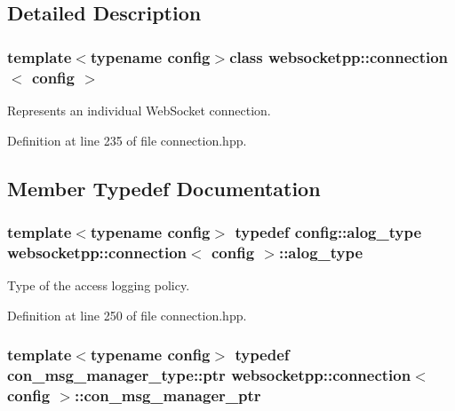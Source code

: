 \subsection{Detailed Description}
\subsubsection*{template$<$typename config$>$class websocketpp\+::connection$<$ config $>$}

Represents an individual Web\+Socket connection. 

Definition at line 235 of file connection.\+hpp.



\subsection{Member Typedef Documentation}
\hypertarget{classwebsocketpp_1_1connection_a2da7d18aecf9153429bab9fcd2bab7b8}{}
\subsubsection[{alog\+\_\+type}]{\setlength{\rightskip}{0pt plus 5cm}template$<$typename config$>$ typedef config\+::alog\+\_\+type {\bf websocketpp\+::connection}$<$ config $>$\+::{\bf alog\+\_\+type}}\label{classwebsocketpp_1_1connection_a2da7d18aecf9153429bab9fcd2bab7b8}


Type of the access logging policy. 



Definition at line 250 of file connection.\+hpp.

\hypertarget{classwebsocketpp_1_1connection_a7bcb608b3a2a645bda4e4c4998f754c7}{}
\subsubsection[{con\+\_\+msg\+\_\+manager\+\_\+ptr}]{\setlength{\rightskip}{0pt plus 5cm}template$<$typename config$>$ typedef con\+\_\+msg\+\_\+manager\+\_\+type\+::ptr {\bf websocketpp\+::connection}$<$ config $>$\+::{\bf con\+\_\+msg\+\_\+manager\+\_\+ptr}}\label{classwebsocketpp_1_1connection_a7bcb608b3a2a645bda4e4c4998f754c7}


